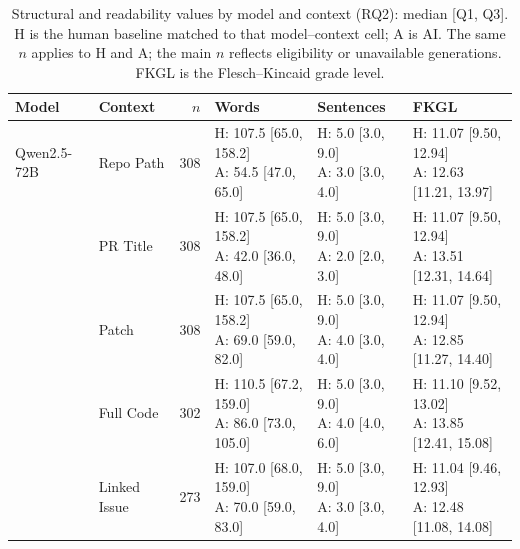 \begin{table}[tp]
\centering
\caption{Structural and readability values by model and context (RQ2): median [Q1, Q3]. H is the human baseline matched to that model--context cell; A is AI. The same $n$ applies to H and A; the main $n$ reflects eligibility or unavailable generations. FKGL is the Flesch--Kincaid grade level.}
\label{tab:rq2_structural_descriptives}
\footnotesize
\setlength{\tabcolsep}{4pt}
\renewcommand{\arraystretch}{1.08}
\begin{tabular}{llrlll}
\toprule
\textbf{Model} & \textbf{Context} & \textbf{$n$} & \textbf{Words} & \textbf{Sentences} & \textbf{FKGL} \\
\midrule
Qwen2.5-72B & Repo Path & 308 & \shortstack[l]{H: 107.5 [65.0, 158.2]\\A: 54.5 [47.0, 65.0]} & \shortstack[l]{H: 5.0 [3.0, 9.0]\\A: 3.0 [3.0, 4.0]} & \shortstack[l]{H: 11.07 [9.50, 12.94]\\A: 12.63 [11.21, 13.97]} \\
 & PR Title & 308 & \shortstack[l]{H: 107.5 [65.0, 158.2]\\A: 42.0 [36.0, 48.0]} & \shortstack[l]{H: 5.0 [3.0, 9.0]\\A: 2.0 [2.0, 3.0]} & \shortstack[l]{H: 11.07 [9.50, 12.94]\\A: 13.51 [12.31, 14.64]} \\
 & Patch & 308 & \shortstack[l]{H: 107.5 [65.0, 158.2]\\A: 69.0 [59.0, 82.0]} & \shortstack[l]{H: 5.0 [3.0, 9.0]\\A: 4.0 [3.0, 4.0]} & \shortstack[l]{H: 11.07 [9.50, 12.94]\\A: 12.85 [11.27, 14.40]} \\
 & Full Code & 302 & \shortstack[l]{H: 110.5 [67.2, 159.0]\\A: 86.0 [73.0, 105.0]} & \shortstack[l]{H: 5.0 [3.0, 9.0]\\A: 4.0 [4.0, 6.0]} & \shortstack[l]{H: 11.10 [9.52, 13.02]\\A: 13.85 [12.41, 15.08]} \\
 & Linked Issue & 273 & \shortstack[l]{H: 107.0 [68.0, 159.0]\\A: 70.0 [59.0, 83.0]} & \shortstack[l]{H: 5.0 [3.0, 9.0]\\A: 3.0 [3.0, 4.0]} & \shortstack[l]{H: 11.04 [9.46, 12.93]\\A: 12.48 [11.08, 14.08]} \\

\end{tabular}
\end{table}
